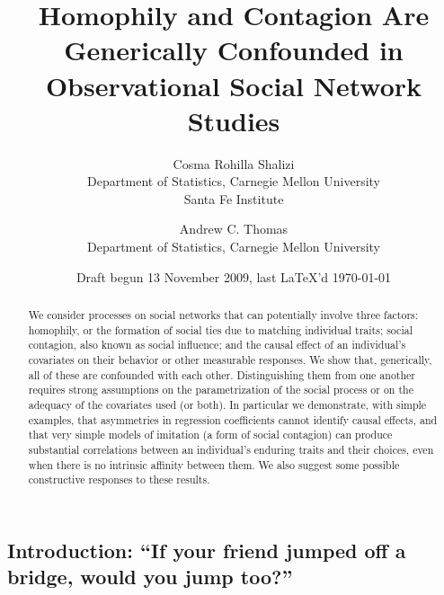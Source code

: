 \documentclass{article}
\begin{document}
\begin{multicols}{2}
\title{Homophily and Contagion Are Generically Confounded in Observational Social Network Studies}
\author{Cosma Rohilla Shalizi\\ {\small Department of Statistics, Carnegie Mellon University}\\
{\small Santa Fe Institute}
\and
Andrew C. Thomas\\
{\small Department of Statistics, Carnegie Mellon University}}
\date{Draft begun 13 November 2009, last \LaTeX 'd \today}
\maketitle

\begin{abstract}
  We consider processes on social networks that can potentially involve three
  factors: homophily, or the formation of social ties due to matching
  individual traits; social contagion, also known as social influence; and the
  causal effect of an individual's covariates on their behavior or other
  measurable responses. We show that, generically, all of these are confounded
  with each other.  Distinguishing them from one another requires strong
  assumptions on the parametrization of the social process or on the adequacy
  of the covariates used (or both).  In particular we demonstrate, with simple
  examples, that asymmetries in regression coefficients cannot identify causal
  effects, and that very simple models of imitation (a form of social
  contagion) can produce substantial correlations between an individual's
  enduring traits and their choices, even when there is no intrinsic affinity
  between them.  We also suggest some possible constructive responses to these
  results.
\end{abstract}

\tableofcontents


\section{Introduction: ``If your friend jumped off a bridge, would you jump too?''}


\end{multicols}
\end{document}
